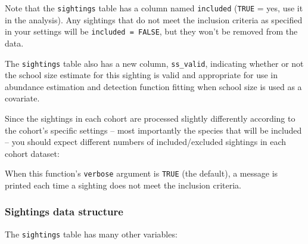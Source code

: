 \documentclass[
]{book}
\newenvironment{Shaded}{\begin{snugshade}}{\end{snugshade}}
\newcommand{\ConstantTok}[1]{\textcolor[rgb]{0.00,0.00,0.00}{#1}}
\newcommand{\DecValTok}[1]{\textcolor[rgb]{0.00,0.00,0.81}{#1}}
\newcommand{\NormalTok}[1]{#1}
\newcommand{\SpecialCharTok}[1]{\textcolor[rgb]{0.00,0.00,0.00}{#1}}
\begin{document}
Note that the \texttt{sightings} table has a column named \texttt{included} (\texttt{TRUE} = yes, use it in the analysis). Any sightings that do not meet the inclusion criteria as specified in your settings will be \texttt{included\ =\ FALSE}, but they won't be removed from the data.

The \texttt{sightings} table also has a new column, \texttt{ss\_valid},
indicating whether or not the school size estimate for this sighting
is valid and appropriate for use in abundance estimation and detection function fitting
when school size is used as a covariate.

Since the sightings in each cohort are processed slightly differently according to the cohort's specific settings -- most importantly the species that will be included -- you should expect different numbers of included/excluded sightings in each cohort dataset:

\begin{Shaded}
\end{Shaded}

When this function's \texttt{verbose} argument is \texttt{TRUE} (the default), a message is printed each time a sighting does not meet the inclusion criteria.

\hypertarget{sightings-data-structure}{%
\subsubsection*{Sightings data structure}\label{sightings-data-structure}}

The \texttt{sightings} table has many other variables:
\end{document}
